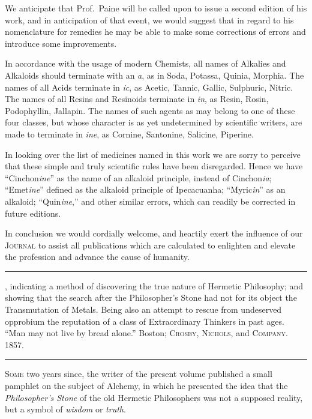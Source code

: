
We anticipate that Prof.\ Paine will be called upon to issue a second
edition of his work, and in anticipation of that event, we would suggest
that in regard to his nomenclature for remedies he may be able to
make some corrections of errors and introduce some improvements.

In accordance with the usage of modern Chemists, all names of
Alkalies and Alkaloids should terminate with an \emph{a}, as in Soda, Potassa,
Quinia, Morphia. The names of all Acids terminate in \emph{ic}, as Acetic,
Tannic, Gallic, Sulphuric, Nitric. The names of all Resins and Resinoids
terminate in \emph{in}, as Resin, Rosin, Podophyllin, Jallapin. The
names of such agents as may belong to one of these four classes, but
whose character is as yet undetermined by scientific writers, are made
to terminate in \emph{ine}, as Cornine, Santonine, Salicine, Piperine.

In looking over the list of medicines named in this work we are sorry
to perceive that these simple and truly scientific rules have been disregarded.
Hence we have ``Cinchon\textit{ine}'' as the name of an alkaloid
principle, instead of Cinchon\textit{ia}; ``Emet\textit{ine}'' defined as the alkaloid
principle of Ipecacuanha; ``Myric\textit{in}'' as an alkaloid; ``Quin\textit{ine},''
and other similar errors, which can readily be corrected in future editions.

In conclusion we would cordially welcome, and heartily exert the influence
of our \textsc{Journal} to assist all publications which are calculated to
enlighten and elevate the profession and advance the cause of humanity.

\fancybreak{* * *}

\footnotesize
{}, indicating a method of discovering the true
nature of Hermetic Philosophy; and showing that the search after the Philosopher's
Stone had not for its object the Transmutation of Metals. Being also an attempt to
rescue from undeserved opprobium the reputation of a class of Extraordinary Thinkers
in past ages. ``Man may not live by bread alone.'' Boston; \textsc{Crosby}, \textsc{Nichols}, and
\textsc{Company}. 1857.
\plainbreak{1}
\normalsize


\lettrine[lines=1]{}{Some} two years since, the writer of the present volume published a
small pamphlet on the subject of Alchemy, in which he presented the
idea that the \emph{Philosopher's Stone} of the old Hermetic Philosophers
was not a supposed reality, but a symbol of \emph{wisdom} or \emph{truth}.

